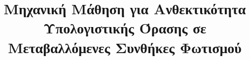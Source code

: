 \documentclass{uthece-thesis}
\title{Μηχανική Μάθηση για Ανθεκτικότητα Υπολογιστικής Όρασης σε Μεταβαλλόμενες Συνθήκες Φωτισμού}
\begin{document}
\frontmatter
\maketitle


	\listoffigures %
	\listoftables %
%


\mainmatter
    
    
    
    
    
    
    
    
%


	



    

\ifgrthesisoption
    \renewcommand{\chaptername}{Παράρτημα}
\else
    \renewcommand{\chaptername}{Appendix}
\fi

    \renewcommand{\thechapter}{A} 
  		
    \renewcommand{\thechapter}{B}
    

%
%    

%
\end{document}
